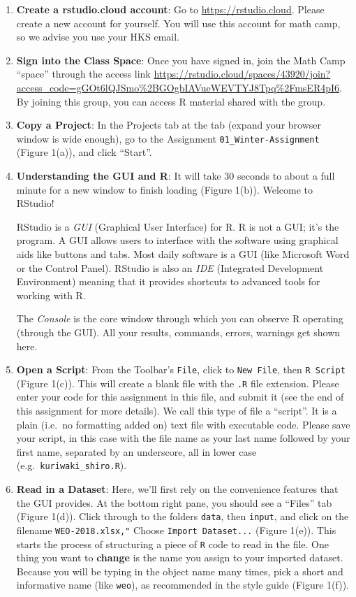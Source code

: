 \documentclass[11pt]{article}
\begin{document}
\begin{enumerate}
\def\labelenumi{\arabic{enumi}.}
\item
  \textbf{Create a rstudio.cloud account}: Go to
  \url{https://rstudio.cloud}. Please create a new account for yourself.
  You will use this account for math camp, so we advise you use your HKS
  email.
\item
  \textbf{Sign into the Class Space}: Once you have signed in, join the
  Math Camp ``space'' through the access link
  \url{https://rstudio.cloud/spaces/43920/join?access_code=gGOt6lQJSmo\%2BGOgbIAVueWEVTYJ8Tpq\%2FmsER4pI6}.
  By joining this group, you can access R material shared with the
  group.
\item
  \textbf{Copy a Project}: In the Projects tab at the tab (expand your
  browser window is wide enough), go to the Assignment
  \texttt{01\_Winter-Assignment} (Figure 1(a)), and click ``Start''.
\item
  \textbf{Understanding the GUI and R}: It will take 30 seconds to about
  a full minute for a new window to finish loading (Figure 1(b)).
  Welcome to RStudio!

  RStudio is a \emph{GUI} (Graphical User Interface) for R. R is not a
  GUI; it's the program. A GUI allows users to interface with the
  software using graphical aids like buttons and tabs. Most daily
  software is a GUI (like Microsoft Word or the Control Panel). RStudio
  is also an \emph{IDE} (Integrated Development Environment) meaning
  that it provides shortcuts to advanced tools for working with R.

  The \emph{Console} is the core window through which you can observe R
  operating (through the GUI). All your results, commands, errors,
  warnings get shown here.
\item
  \textbf{Open a Script}: From the Toolbar's \texttt{File}, click to
  \texttt{New\ File}, then \texttt{R\ Script} (Figure 1(c)). This will
  create a blank file with the \texttt{.R} file extension. Please enter
  your code for this assignment in this file, and submit it (see the end
  of this assignment for more details). We call this type of file a
  ``script''. It is a plain (i.e.~no formatting added on) text file with
  executable code. Please save your script, in this case with the file
  name as your last name followed by your first name, separated by an
  underscore, all in lower case (e.g.~\texttt{kuriwaki\_shiro.R}).
\item
  \textbf{Read in a Dataset}: Here, we'll first rely on the convenience
  features that the GUI provides. At the bottom right pane, you should
  see a ``Files'' tab (Figure 1(d)). Click through to the folders
  \texttt{data}, then \texttt{input}, and click on the filename
  \texttt{WEO-2018.xlsx,"} Choose \texttt{Import\ Dataset...} (Figure
  1(e)). This starts the process of structuring a piece of \texttt{R}
  code to read in the file. One thing you want to \textbf{change} is the
  name you assign to your imported dataset. Because you will be typing
  in the object name many times, pick a short and informative name (like
  \texttt{weo}), as recommended in the style guide (Figure 1(f)).


\end{enumerate}
\end{document}
